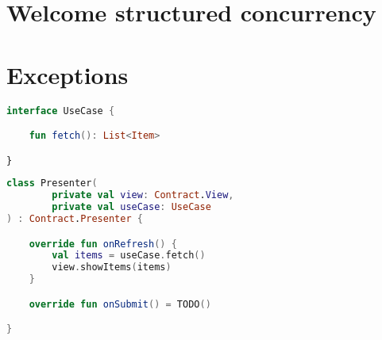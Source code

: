 \documentclass[10pt]{beamer}
\begin{document}
\section{Welcome structured concurrency}


\section{Exceptions}




\begin{frame}[fragile]
\begin{lstlisting}[language=Kotlin, basicstyle=\ttfamily]
interface UseCase {

    fun fetch(): List<Item>

}
\end{lstlisting}
\end{frame}



\begin{frame}[fragile]
\begin{lstlisting}[language=Kotlin, basicstyle=\ttfamily]
class Presenter(
        private val view: Contract.View,
        private val useCase: UseCase
) : Contract.Presenter {

    override fun onRefresh() {
        val items = useCase.fetch()
        view.showItems(items)
    }

    override fun onSubmit() = TODO()

}
\end{lstlisting}
\end{frame}



\begin{frame}[fragile]
\begin{lstlisting}[language=Kotlin, basicstyle=\ttfamily]
\end{lstlisting}
\end{frame}


\begin{frame}[fragile]
\begin{lstlisting}[language=Kotlin, basicstyle=\ttfamily]
\end{lstlisting}
\end{frame}

\begin{frame}[fragile]
\begin{lstlisting}[language=Kotlin, basicstyle=\ttfamily]
\end{lstlisting}
\end{frame}

\begin{frame}[fragile]
\begin{lstlisting}[language=Kotlin, basicstyle=\ttfamily]
\end{lstlisting}
\end{frame}


\begin{frame}[fragile]
\begin{lstlisting}[language=Kotlin, basicstyle=\ttfamily]
\end{lstlisting}
\end{frame}









\end{document}
